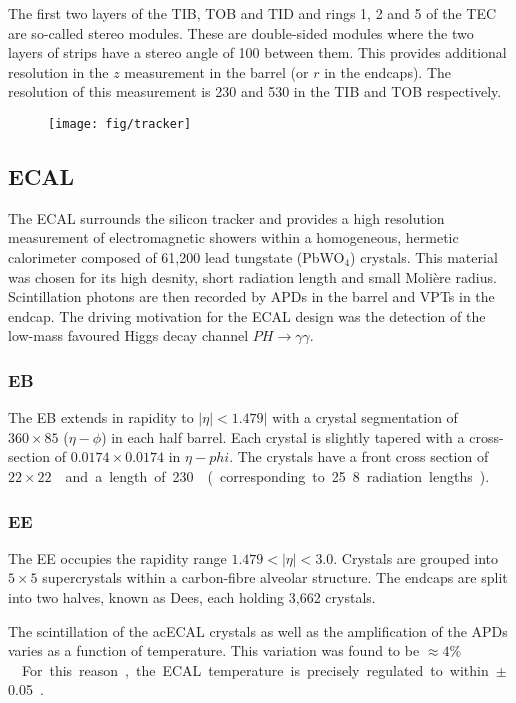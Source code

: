 The first two layers of the \ac{TIB}, \ac{TOB} and \ac{TID} and rings 1, 2 and 5
of the \ac{TEC} are so-called stereo modules. These are double-sided modules
where the two layers of strips have a stereo angle of \unit{100}{\milli\radian}
between them. This provides additional resolution in the $z$ measurement in the
barrel (or $r$ in the endcaps). The resolution of this measurement is
\unit{230}{\micro\metre} and \unit{530}{\micro\metre} in the \ac{TIB} and
\ac{TOB} respectively.

\begin{figure}
\texttt{[image: fig/tracker]}
\end{figure}

\subsection{\acl{ECAL}}
The \ac{ECAL} surrounds the silicon tracker and provides a high resolution
measurement of electromagnetic showers within a homogeneous, hermetic
calorimeter composed of 61,200 lead tungstate (PbWO$_4$) crystals. This material
was chosen for its high desnity, short radiation length and small Moli\`{e}re
radius. Scintillation photons are then recorded by \ac{APD}s in the barrel and
\ac{VPT}s in the endcap. The driving motivation for the \ac{ECAL} design was the
detection of the low-mass favoured Higgs decay channel
$PH\longrightarrow\gamma\gamma$.

\subsubsection{\acl{EB}}
The \ac{EB} extends in rapidity to $|\eta|<1.479|$ with a crystal
segmentation of $360\times 85$ ($\eta-\phi$) in each half barrel. Each crystal
is slightly tapered with a cross-section of $0.0174\times0.0174$ in
$\eta-phi$. The crystals have a front cross section of \unit{$22\times
  22$}{\milli\metre\squared} and a length of \unit{230}{\milli\metre}
(corresponding to 25.8 radiation lengths).

\subsubsection{\acl{EE}}
The \ac{EE} occupies the rapidity range $1.479 < |\eta| < 3.0$. Crystals are
grouped into $5\times 5$ supercrystals within a carbon-fibre alveolar
structure. The endcaps are split into two halves, known as Dees, each holding
3,662 crystals.

The scintillation of the ac{ECAL} crystals as well as the amplification of the
\ac{APDs} varies as a function of temperature. This variation was found to be
\unit{$\approx 4\%$}{\per\celsius}. For this reason, the \ac{ECAL} temperature
is precisely regulated to within \unit{$\pm$ 0.05}{\celsius}.


